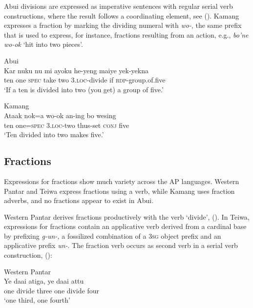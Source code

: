 Abui divisions are expressed as imperative sentences with regular serial verb constructions, where the result follows a coordinating element, see (). Kamang expresses a fraction by marking the dividing numeral with \textit{wo-}, the same prefix that is used to express, for instance, fractions resulting from an action, e.g., \textit{bo'ne wo-ok} `hit into two pieces'.


\ea%
\label{bkm:Ref358116296}
Abui\\
\gll  Kar  nuku  nu  mi  ayoku  he-yeng  maiye  yek-yekna \\
    ten  one  \textsc{spec}  take  two  3.\textsc{loc-}divide  if  \textsc{rdp-}group.of.five \\
\glt  `If a ten is divided into two (you get) a group of five.'
\z








\ea
Kamang\\
 \gll Ataak  nok=a  wo-ok  an-ing  bo  wesing \\
  ten  one=\textsc{spec}  \textsc{3.loc}-two  thus-set  \textsc{conj}  five \\
 \glt`Ten divided into two makes five.'
\z


\subsection{Fractions}
Expressions for fractions show much variety across the AP languages. Western Pantar and Teiwa express fractions using a verb, while Kamang uses fraction adverbs, and no fractions appear to exist in Abui.

Western Pantar derives fractions productively with the verb `divide', (). In Teiwa, expressions for fractions contain an applicative verb derived from a cardinal base by prefixing \textit{g-un-,} a fossilized combination of a 3\textsc{sg} object prefix and an applicative prefix \textit{un-}. The fraction verb occurs as second verb in a serial verb construction, ():


\ea%
\label{bkm:Ref342746525}
Western Pantar \\
\gll   Ye  daai  atiga,  ye   daai  attu\\
   one   divide  three   one  divide  four \\
\glt  `one third, one fourth'
\z








